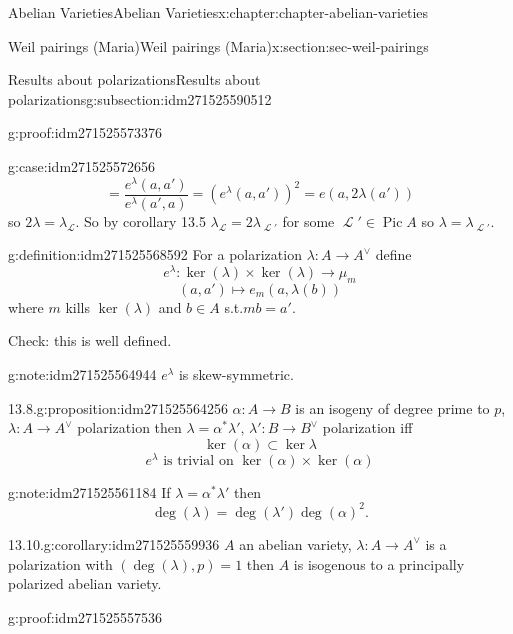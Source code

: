 \documentclass[oneside,10pt,]{book}
\numberwithin{equation}{section}
\newcommand{\sheaf}[1]{\operatorname{\mathcal{#1}}}
\DeclareMathOperator{\Pic}{Pic}
\begin{document}
\begin{chapterptx}{Abelian Varieties}{}{Abelian Varieties}{}{}{x:chapter:chapter-abelian-varieties}
\begin{sectionptx}{Weil pairings (Maria)}{}{Weil pairings (Maria)}{}{}{x:section:sec-weil-pairings}
\begin{subsectionptx}{Results about polarizations}{}{Results about polarizations}{}{}{g:subsection:idm271525590512}
\begin{proofptx}{}{g:proof:idm271525573376}
\begin{case}{}{}{g:case:idm271525572656}
\begin{equation*}
= \frac{e^\lambda(a,a')}{ e^\lambda(a',a)} = (e^\lambda(a,a'))^2 = e(a,2\lambda (a'))
\end{equation*}
so \(2\lambda = \lambda_{\sheaf L}\). So by corollary 13.5 \(\lambda_{\sheaf L} = 2\lambda_{\sheaf L'}\) for some \(\sheaf L' \in \Pic A\) so \(\lambda = \lambda_{\sheaf L'}\).%
\end{case}
\end{proofptx}
\begin{definition}{}{g:definition:idm271525568592}%
For a  polarization \(\lambda \colon A\to A^\vee\) define%
\begin{equation*}
e^{\lambda} \colon \ker(\lambda)\times \ker(\lambda) \to \mu_m
\end{equation*}
%
\begin{equation*}
(a,a')\mapsto e_m(a,\lambda(b))
\end{equation*}
where \(m \) kills \(\ker(\lambda)\) and \(b \in A\) s.t.\(mb = a'\).%
\end{definition}
Check: this is well defined.%
\begin{note}{}{g:note:idm271525564944}%
\(e^\lambda\) is skew-symmetric.%
\end{note}
\begin{proposition}{13.8.}{}{g:proposition:idm271525564256}%
\(\alpha\colon A \to B\) is an isogeny of degree prime to \(p\), \(\lambda\colon A\to A^\vee\) polarization then \(\lambda = \alpha^* \lambda', \,\lambda' \colon B\to B^\vee\) polarization iff%
\begin{equation*}
\ker(\alpha) \subset \ker \lambda
\end{equation*}
%
\begin{equation*}
e^{\lambda} \text{ is trivial on } \ker (\alpha)\times \ker(\alpha)
\end{equation*}
%
\end{proposition}
\begin{note}{}{g:note:idm271525561184}%
If \(\lambda = \alpha^* \lambda'\) then%
\begin{equation*}
\deg(\lambda) = \deg (\lambda') \deg(\alpha)^2\text{.}
\end{equation*}
%
\end{note}
\begin{corollary}{13.10.}{}{g:corollary:idm271525559936}%
\(A\) an abelian variety, \(\lambda \colon A \to A^\vee\) is a polarization with \((\deg (\lambda), p) = 1\) then \(A\) is  isogenous to a principally polarized abelian variety.%
\end{corollary}
\begin{proofptx}{}{g:proof:idm271525557536}

\end{proofptx}
\end{subsectionptx}
\end{sectionptx}
\end{chapterptx}
\end{document}
